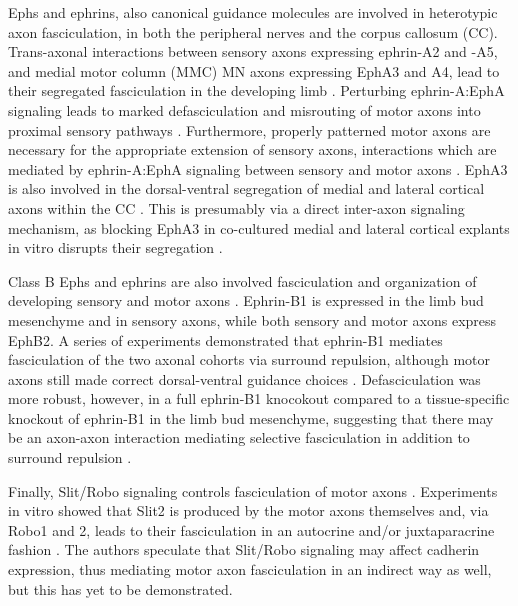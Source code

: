 Ephs and ephrins, also canonical guidance molecules \cite{bashaw2010signaling,kolodkin2011mechanisms} are involved in heterotypic axon fasciculation, in both the peripheral nerves and the corpus callosum (CC).
Trans-axonal interactions between sensory axons expressing ephrin-A2 and -A5, and medial motor column (MMC) MN axons expressing EphA3 and A4, lead to their segregated fasciculation in the developing limb \cite{gallarda2008segregation}.
Perturbing ephrin-A:EphA signaling leads to marked defasciculation and misrouting of motor axons into proximal sensory pathways \cite{gallarda2008segregation}.
Furthermore, properly patterned motor axons are necessary for the appropriate extension of sensory axons, interactions which are mediated by ephrin-A:EphA signaling between sensory and motor axons \cite{wang2011anatomical}.
EphA3 is also involved in the dorsal-ventral segregation of medial and lateral cortical axons within the CC \cite{nishikimi2011segregation}.
This is presumably via a direct inter-axon signaling mechanism, as blocking EphA3 in co-cultured medial and lateral cortical explants in vitro disrupts their segregation \cite{nishikimi2011segregation}.

Class B Ephs and ephrins are also involved fasciculation and organization of developing sensory and motor axons \cite{luxey2013eph}.
Ephrin-B1 is expressed in the limb bud mesenchyme and in sensory axons, while both sensory and motor axons express EphB2.
A series of experiments demonstrated that ephrin-B1 mediates fasciculation of the two axonal cohorts via surround repulsion, although motor axons still made correct dorsal-ventral guidance choices \cite{luxey2013eph}.
Defasciculation was more robust, however, in a full ephrin-B1 knocokout compared to a tissue-specific knockout of ephrin-B1 in the limb bud mesenchyme, suggesting that there may be an axon-axon interaction mediating selective fasciculation in addition to surround repulsion \cite{luxey2013eph}.

Finally, Slit/Robo signaling controls fasciculation of motor axons \cite{jaworski2012autocrine}.
Experiments in vitro showed that Slit2 is produced by the motor axons themselves and, via Robo1 and 2, leads to their fasciculation in an autocrine and/or juxtaparacrine fashion \cite{jaworski2012autocrine}.
The authors speculate that Slit/Robo signaling may affect cadherin expression, thus mediating motor axon fasciculation in an indirect way as well, but this has yet to be demonstrated.